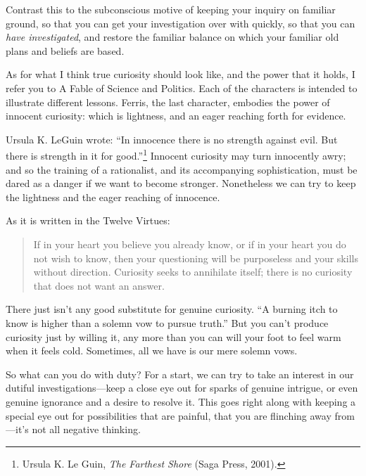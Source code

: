 {
 Contrast this to the subconscious motive of keeping your inquiry
on familiar ground, so that you can get your investigation over with
quickly, so that you can \textit{have investigated}, and restore the
familiar balance on which your familiar old plans and beliefs are
based.}

{
 As for what I think true curiosity should look like, and the power
that it holds, I refer you to A Fable of Science and Politics. Each of
the characters is intended to illustrate different lessons. Ferris, the
last character, embodies the power of innocent curiosity: which is
lightness, and an eager reaching forth for evidence.}

{
 Ursula K. LeGuin wrote: ``In innocence there is
no strength against evil. But there is strength in it for
good.''\footnote{Ursula K. Le Guin, \textit{The Farthest Shore} (Saga Press,
2001).} Innocent curiosity may
turn innocently awry; and so the training of a rationalist, and its
accompanying sophistication, must be dared as a danger if we want to
become stronger. Nonetheless we can try to keep the lightness and the
eager reaching of innocence.}

{
 As it is written in the Twelve Virtues:}

\begin{quote}
{
 If in your heart you believe you already know, or if in your heart
you do not wish to know, then your questioning will be purposeless and
your skills without direction. Curiosity seeks to annihilate itself;
there is no curiosity that does not want an answer.}
\end{quote}

{
 There just isn't any good substitute for genuine
curiosity. ``A burning itch to know is higher than a
solemn vow to pursue truth.'' But you
can't produce curiosity just by willing it, any more
than you can will your foot to feel warm when it feels cold. Sometimes,
all we have is our mere solemn vows.}

{
 So what can you do with duty? For a start, we can try to take an
interest in our dutiful investigations---keep a close eye out for
sparks of genuine intrigue, or even genuine ignorance and a desire to
resolve it. This goes right along with keeping a special eye out for
possibilities that are painful, that you are flinching away
from---it's not all negative thinking.}

